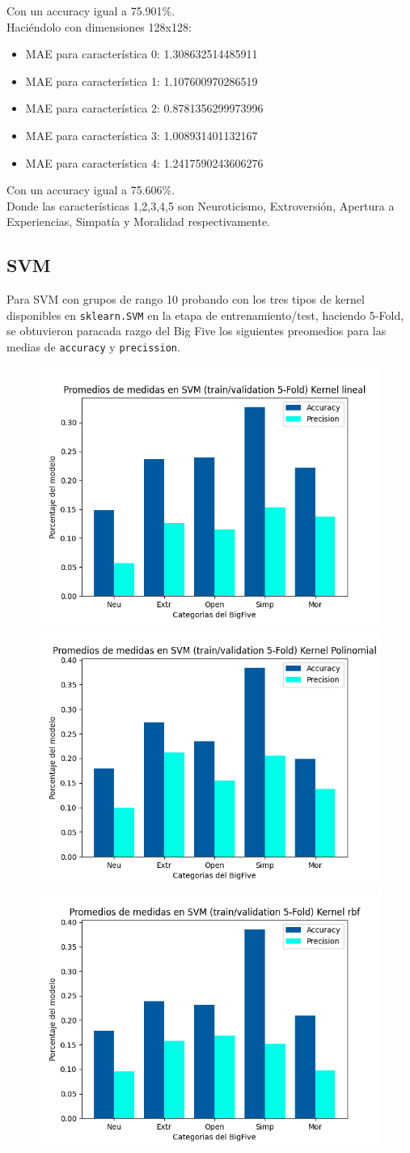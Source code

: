 \documentclass[10pt, a4paper]{article}
\begin{document}
                Con un accuracy igual a 75.901\%.\\

                Haci\'endolo con dimensiones 128x128:
                \begin{itemize}
                    \item[] MAE para caracter\'istica 0: 1.308632514485911
                    \item[] MAE para caracter\'istica 1: 1.107600970286519
                    \item[] MAE para caracter\'istica 2: 0.8781356299973996
                    \item[] MAE para caracter\'istica 3: 1.008931401132167
                    \item[] MAE para caracter\'istica 4: 1.2417590243606276
                \end{itemize}
                
                Con un accuracy igual a 75.606\%.\\
                
                Donde las caracter\'isticas 1,2,3,4,5 son Neuroticismo, Extroversi\'on, Apertura a Experiencias, 
                Simpat\'ia y Moralidad respectivamente.
            
            \subsection{SVM} 
            Para SVM con grupos de rango 10 probando con los tres tipos de kernel disponibles en \texttt{sklearn.SVM} en la etapa de 
            entrenamiento/test, haciendo 5-Fold, se obtuvieron paracada razgo del Big Five los siguientes preomedios para las medias de
            \texttt{accuracy} y \texttt{precission}.

            \begin{figure}[H]
                \centering
                \includegraphics[width = 0.3\linewidth]{Medias_Lineal10.png}
                \includegraphics[width = 0.3\linewidth]{Medias_Polinomial10.png}
                \includegraphics[width = 0.3\linewidth]{Medias_rbf10.png}

            \end{figure}
\end{document}
